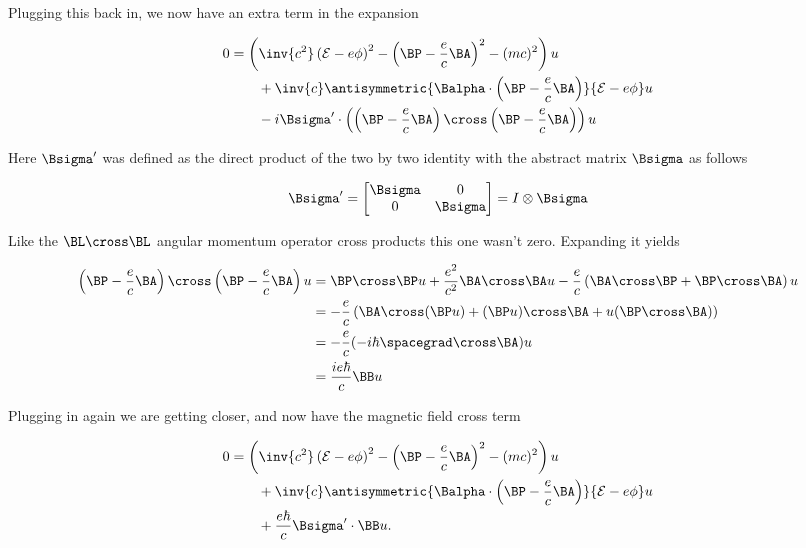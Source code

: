 Plugging this back in, we now have an extra term in the expansion

\begin{align*}
0
&=
\left(
\inv{c^2} \left( \mathcal{E} - e \phi \right)^2
- \left( \BP - \frac{e}{c} \BA \right)^2
- (mc)^2 
\right) u
\\
&\qquad + \inv{c} \antisymmetric{
\Balpha \cdot \left(\BP - \frac{e}{c} \BA \right) 
}
{
\mathcal{E} - e \phi 
} u
\\
&\qquad 
- i \Bsigma' \cdot 
\left(
\left( \BP - \frac{e}{c} \BA \right) \cross \left( \BP - \frac{e}{c} \BA \right)
\right)
 u
\end{align*}

Here $\Bsigma'$ was defined as the direct product of the two by two identity with the abstract matrix $\Bsigma$ as follows

\begin{equation}\label{eqn:diracGauge:n}
\Bsigma' = 
\begin{bmatrix}
\Bsigma & 0 \\
0 & \Bsigma
\end{bmatrix}
= I \otimes \Bsigma
\end{equation}

Like the $\BL \cross \BL$ angular momentum operator cross products this one wasn't zero.  Expanding it yields

\begin{align*}
\left( \BP - \frac{e}{c} \BA \right) \cross \left( \BP - \frac{e}{c} \BA \right)
 u
&=
\BP \cross \BP u
+ \frac{e^2}{c^2} \BA \cross \BA u
- \frac{e}{c} \left( \BA \cross \BP + \BP \cross \BA \right) u \\
&=
- \frac{e}{c} \left( \BA \cross (\BP u) + (\BP u) \cross \BA + u (\BP \cross \BA) \right) \\
&=
- \frac{e}{c} (-i \hbar \spacegrad \cross \BA) u \\
&=
\frac{i e \hbar}{c} \BB u
\end{align*}

Plugging in again we are getting closer, and now have the magnetic field cross term

\begin{align*}
0
&=
\left(
\inv{c^2} \left( \mathcal{E} - e \phi \right)^2
- \left(\BP - \frac{e}{c} \BA \right)^2
- (mc)^2 
\right) u
\\
&\qquad + \inv{c} 
\antisymmetric{
\Balpha \cdot \left(\BP - \frac{e}{c} \BA \right) 
}
{
\mathcal{E} - e \phi 
} u
\\
&\qquad 
+ \frac{e \hbar}{c} \Bsigma' \cdot \BB u.
\end{align*}

